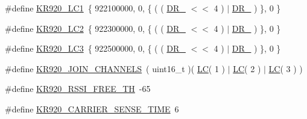 \begin{DoxyCompactItemize}
\item 
\#define \mbox{\hyperlink{group___r_e_g_i_o_n_k_r920_gac390f2ca3193094872899d5062f6e9c9}{K\+R920\+\_\+\+L\+C1}}~\{ 922100000, 0, \{ ( ( \mbox{\hyperlink{group___r_e_g_i_o_n_ga872e12c82020c02a7f70a1c6ed1375df}{D\+R\+\_}} $<$$<$ 4 ) $\vert$ \mbox{\hyperlink{group___r_e_g_i_o_n_ga6c4ef966b4f3d5eb7597b087f2b97095}{D\+R\+\_}} ) \}, 0 \}
\item 
\#define \mbox{\hyperlink{group___r_e_g_i_o_n_k_r920_ga1253892583b3997c9fd45c2a0934fa78}{K\+R920\+\_\+\+L\+C2}}~\{ 922300000, 0, \{ ( ( \mbox{\hyperlink{group___r_e_g_i_o_n_ga872e12c82020c02a7f70a1c6ed1375df}{D\+R\+\_}} $<$$<$ 4 ) $\vert$ \mbox{\hyperlink{group___r_e_g_i_o_n_ga6c4ef966b4f3d5eb7597b087f2b97095}{D\+R\+\_}} ) \}, 0 \}
\item 
\#define \mbox{\hyperlink{group___r_e_g_i_o_n_k_r920_gac8d050d9705d659f5b5977beaf53f5a0}{K\+R920\+\_\+\+L\+C3}}~\{ 922500000, 0, \{ ( ( \mbox{\hyperlink{group___r_e_g_i_o_n_ga872e12c82020c02a7f70a1c6ed1375df}{D\+R\+\_}} $<$$<$ 4 ) $\vert$ \mbox{\hyperlink{group___r_e_g_i_o_n_ga6c4ef966b4f3d5eb7597b087f2b97095}{D\+R\+\_}} ) \}, 0 \}
\item 
\#define \mbox{\hyperlink{group___r_e_g_i_o_n_k_r920_ga12eb4db7cb18ecc9f503f7f67a245398}{K\+R920\+\_\+\+J\+O\+I\+N\+\_\+\+C\+H\+A\+N\+N\+E\+LS}}~( uint16\+\_\+t )( \mbox{\hyperlink{group___r_e_g_i_o_n_ga12fa17e5c1016e01a9d82c25027deb1b}{LC}}( 1 ) $\vert$ \mbox{\hyperlink{group___r_e_g_i_o_n_ga12fa17e5c1016e01a9d82c25027deb1b}{LC}}( 2 ) $\vert$ \mbox{\hyperlink{group___r_e_g_i_o_n_ga12fa17e5c1016e01a9d82c25027deb1b}{LC}}( 3 ) )
\item 
\#define \mbox{\hyperlink{group___r_e_g_i_o_n_k_r920_ga5981bd453121b95dfa7c0c6b28d5043b}{K\+R920\+\_\+\+R\+S\+S\+I\+\_\+\+F\+R\+E\+E\+\_\+\+TH}}~-\/65
\item 
\#define \mbox{\hyperlink{group___r_e_g_i_o_n_k_r920_ga723a038e6f34d61637cde94bf5be5e55}{K\+R920\+\_\+\+C\+A\+R\+R\+I\+E\+R\+\_\+\+S\+E\+N\+S\+E\+\_\+\+T\+I\+ME}}~6
\end{DoxyCompactItemize}
